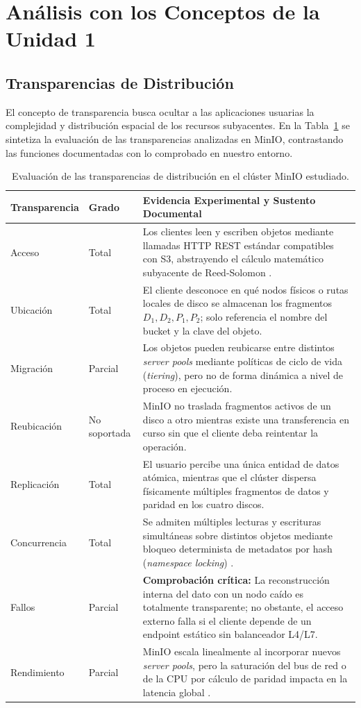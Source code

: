 \documentclass[12pt,a4paper]{article}
\begin{document}
\section{Análisis con los Conceptos de la Unidad 1}

\subsection{Transparencias de Distribución}
El concepto de transparencia busca ocultar a las aplicaciones usuarias la complejidad y distribución espacial de los recursos subyacentes. En la Tabla~\ref{tab:transparencias} se sintetiza la evaluación de las transparencias analizadas en MinIO, contrastando las funciones documentadas con lo comprobado en nuestro entorno.

\begin{table}[H]
\centering\footnotesize
\caption{Evaluación de las transparencias de distribución en el clúster MinIO estudiado.}
\begin{tabularx}{\linewidth}{@{}p{2.3cm}p{1.6cm}X@{}}
\toprule
\textbf{Transparencia} & \textbf{Grado} & \textbf{Evidencia Experimental y Sustento Documental} \\
\midrule
Acceso & Total & Los clientes leen y escriben objetos mediante llamadas HTTP REST estándar compatibles con S3, abstrayendo el cálculo matemático subyacente de Reed-Solomon \cite{gadban2021s3hpc}. \\
Ubicación & Total & El cliente desconoce en qué nodos físicos o rutas locales de disco se almacenan los fragmentos $D_1, D_2, P_1, P_2$; solo referencia el nombre del bucket y la clave del objeto. \\
Migración & Parcial & Los objetos pueden reubicarse entre distintos \emph{server pools} mediante políticas de ciclo de vida (\emph{tiering}), pero no de forma dinámica a nivel de proceso en ejecución. \\
Reubicación & No soportada & MinIO no traslada fragmentos activos de un disco a otro mientras existe una transferencia en curso sin que el cliente deba reintentar la operación. \\
Replicación & Total & El usuario percibe una única entidad de datos atómica, mientras que el clúster dispersa físicamente múltiples fragmentos de datos y paridad en los cuatro discos. \\
Concurrencia & Total & Se admiten múltiples lecturas y escrituras simultáneas sobre distintos objetos mediante bloqueo determinista de metadatos por hash (\emph{namespace locking}) \cite{chung2026smallstart}. \\
Fallos & Parcial & \textbf{Comprobación crítica:} La reconstrucción interna del dato con un nodo caído es totalmente transparente; no obstante, el acceso externo falla si el cliente depende de un endpoint estático sin balanceador L4/L7. \\
Rendimiento & Parcial & MinIO escala linealmente al incorporar nuevos \emph{server pools}, pero la saturación del bus de red o de la CPU por cálculo de paridad impacta en la latencia global \cite{shin2023cache}. \\
\bottomrule
\end{tabularx}
\label{tab:transparencias}
\end{table}
\end{document}
